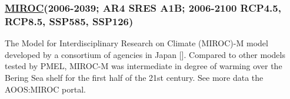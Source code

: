 \documentclass[
]{article}
\begin{document}
\hypertarget{miroc2006-2039-ar4-sres-a1b-2006-2100-rcp4.5-rcp8.5-ssp585-ssp126}{%
\subsubsection{\texorpdfstring{\href{www.cger.nies.go.jp/publications/report/i073/I073.pdf}{MIROC}(2006-2039;
AR4 SRES A1B; 2006-2100 RCP4.5, RCP8.5, SSP585,
SSP126)}{MIROC(2006-2039; AR4 SRES A1B; 2006-2100 RCP4.5, RCP8.5, SSP585, SSP126)}}\label{miroc2006-2039-ar4-sres-a1b-2006-2100-rcp4.5-rcp8.5-ssp585-ssp126}}

The Model for Interdisciplinary Research on Climate (MIROC)-M model
developed by a consortium of agencies in Japan {[}{]}. Compared to other
models tested by PMEL, MIROC-M was intermediate in degree of warming
over the Bering Sea shelf for the first half of the 21st century. See
more data the AOOS:MIROC portal.
\end{document}
